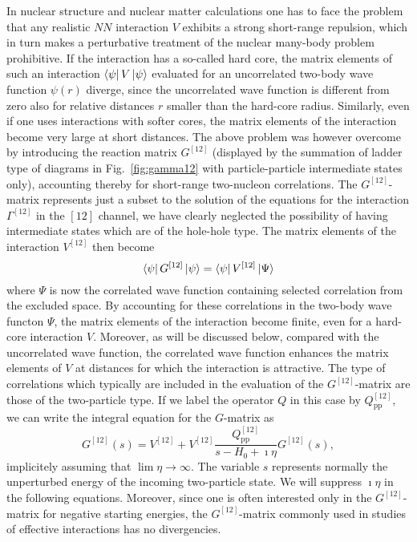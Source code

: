 In nuclear structure and nuclear matter calculations one has to
face the problem that any realistic $NN$ interaction $V$
exhibits a strong short-range repulsion, which in turn makes
a perturbative treatment of the nuclear many-body problem
prohibitive. If the interaction has a so-called hard core,
the matrix elements of such an interaction $\left\langle \psi \right|V\left| \psi \right\rangle$
evaluated
for an uncorrelated two-body wave function $\psi (r)$ diverge,
since the uncorrelated wave function is different from zero also for
relative distances $r$ smaller than the hard-core radius. Similarly,
even if one uses interactions with softer cores, the matrix elements of the
interaction become very large at short distances.
The above problem was however overcome by
introducing the reaction matrix $G^{[12]}$ (displayed by  the summation
of ladder type of diagrams in Fig.\ \ref{fig:gamma12}
with particle-particle intermediate states only),
accounting thereby for short-range two-nucleon correlations.
The $G^{[12]}$-matrix represents just a subset to the solution
of the equations for the interaction $\Gamma^{[12]}$ in the $[12]$ channel,
we have clearly neglected the possibility of having intermediate states
which are of the hole-hole type.  
The matrix elements of the
interaction $V^{[12]}$ then become
\begin{equation}
\left\langle \psi \right|G^{[12]}\left| \psi \right\rangle =\left\langle \psi \right|V^{[12]}\left| \Psi \right\rangle
\end{equation}
where $\Psi$ is now the correlated wave function
containing selected correlation from the excluded space.
By accounting for these
correlations in the two-body wave functon $\Psi$, the matrix elements of
the interaction become finite, even for a hard-core interaction $V$. Moreover,
as will be discussed below, compared with the uncorrelated
wave function, the correlated wave function enhances the
matrix elements of $V$ at distances for which the interaction is
attractive.
The type of correlations which typically are included in the evaluation
of the $G^{[12]}$-matrix are those of the two-particle type.
If we label the operator $Q$ in this case by $Q^{[12]}_{\mathrm{pp}}$, we can write
the integral equation for the $G$-matrix as 
\begin{equation}
   G^{[12]}(s)=V^{[12]}+V^{[12]}\frac{Q^{[12]}_{\mathrm{pp}}}
           {s -H_0+\imath \eta}G^{[12]}(s),
   \label{eq:g1}
\end{equation}
implicitely assuming that $\lim \eta \rightarrow \infty$. 
The variable $s$ represents normally the unperturbed 
energy of the incoming two-particle state. We will suppress $\imath \eta$ in the 
following equations. Moreover, since one is often interested only in the 
$G^{[12]}$-matrix
for negative starting energies, the $G^{[12]}$-matrix commonly used in studies
of effective interactions has no divergencies.

